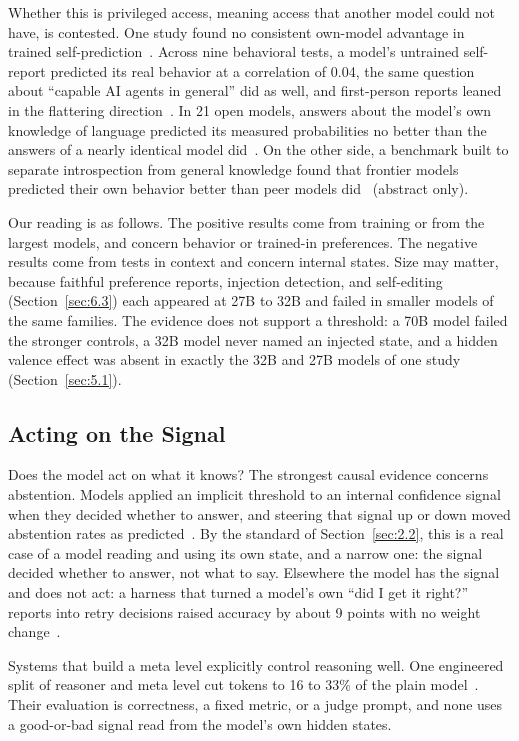 \documentclass[journal]{IEEEtran}
\begin{document}
Whether this is privileged access, meaning access that another model could not have, is contested. One study found no consistent own-model advantage in trained self-prediction~\cite{Zeng2026}. Across nine behavioral tests, a model's untrained self-report predicted its real behavior at a correlation of 0.04, the same question about ``capable AI agents in general'' did as well, and first-person reports leaned in the flattering direction~\cite{Blandfort2026}. In 21 open models, answers about the model's own knowledge of language predicted its measured probabilities no better than the answers of a nearly identical model did~\cite{Song2025}. On the other side, a benchmark built to separate introspection from general knowledge found that frontier models predicted their own behavior better than peer models did~\cite{Naphade2026} (abstract only).

Our reading is as follows. The positive results come from training or from the largest models, and concern behavior or trained-in preferences. The negative results come from tests in context and concern internal states. Size may matter, because faithful preference reports, injection detection, and self-editing (Section~\ref{sec:6.3}) each appeared at 27B to 32B and failed in smaller models of the same families. The evidence does not support a threshold: a 70B model failed the stronger controls, a 32B model never named an injected state, and a hidden valence effect was absent in exactly the 32B and 27B models of one study (Section~\ref{sec:5.1}).

\subsection{Acting on the Signal}\label{sec:3.4}

Does the model act on what it knows? The strongest causal evidence concerns abstention. Models applied an implicit threshold to an internal confidence signal when they decided whether to answer, and steering that signal up or down moved abstention rates as predicted~\cite{Kumaran2026}. By the standard of Section~\ref{sec:2.2}, this is a real case of a model reading and using its own state, and a narrow one: the signal decided whether to answer, not what to say. Elsewhere the model has the signal and does not act: a harness that turned a model's own ``did I get it right?'' reports into retry decisions raised accuracy by about 9 points with no weight change~\cite{Cao2026}.

Systems that build a meta level explicitly control reasoning well. One engineered split of reasoner and meta level cut tokens to 16 to 33\% of the plain model~\cite{Dong2025}. Their evaluation is correctness, a fixed metric, or a judge prompt, and none uses a good-or-bad signal read from the model's own hidden states.
\end{document}
